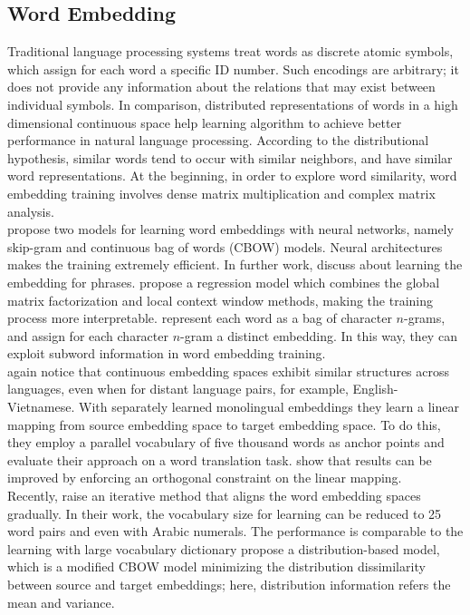 \subsection{Word Embedding}
\indent Traditional language processing systems treat words as discrete atomic symbols, which assign for each word a specific ID number. Such encodings are arbitrary; it does not provide any information about the relations that may exist between individual symbols. In comparison, distributed representations of words in a high dimensional continuous space help learning algorithm to achieve better performance in natural language processing. According to the distributional hypothesis, similar words tend to occur with similar neighbors, and have similar word representations. At the beginning, in order to explore word similarity, word embedding training involves dense matrix multiplication and complex matrix analysis. \\
\cite{mikolov2013efficient} propose two models for learning word embeddings with neural networks, namely skip-gram and continuous bag of words (CBOW) models. Neural architectures makes the training extremely efficient. In further work, \cite{mikolov2013distributed} discuss about learning the embedding for phrases. \cite{pennington2014glove} propose a regression model which combines the global matrix factorization and local context window methods, making the training process more interpretable. \cite{bojanowski2016enriching} represent each word as a bag of character $n$-grams, and assign for each character $n$-gram a distinct embedding. In this way, they can exploit subword information in word embedding training. \\
\cite{mikolov2013exploiting} again notice that continuous embedding spaces exhibit similar structures across languages, even when for distant language pairs, for example, English-Vietnamese.  With separately learned monolingual embeddings they learn a linear mapping from source embedding space to target embedding space. To do this, they employ a parallel vocabulary of five thousand words as anchor points and evaluate their approach on a word translation task. \cite{xing2015normalized} show that results can be improved by enforcing an orthogonal constraint on the linear mapping. \\
Recently, \cite{artetxe2017learning} raise an iterative method that aligns the word embedding spaces gradually. In their work, the vocabulary size for learning can be reduced to 25 word pairs and even with Arabic numerals. The performance is comparable to the learning with large vocabulary dictionary \cite{cao2016distribution} propose a distribution-based model, which is a modified CBOW model minimizing the distribution dissimilarity between source and target embeddings; here, distribution information refers the mean and variance. 
